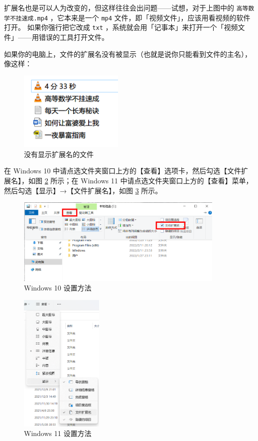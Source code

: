 扩展名也是可以人为改变的，但这样往往会出问题——试想，对于上图中的 \texttt{高等数学不挂速成.mp4} ，它本来是一个 \verb|mp4| 文件，即「视频文件」，应该用看视频的软件打开。
如果你强行把它改成 \verb|txt| ，系统就会用「记事本」来打开一个「视频文件」——用错误的工具打开文件。

如果你的电脑上，文件的扩展名没有被显示（也就是说你只能看到文件的主名），像这样：

\begin{figure}[htb!]
  \centering
  \includegraphics[width=5cm]{assets/Files_No_Ext.png}
  \caption{没有显示扩展名的文件}
  \label{File_No_Ext}
\end{figure}

在 Windows 10 中请点选文件夹窗口上方的【查看】选项卡，然后勾选【文件扩展名】，如图 \ref{Windows_10_set_full_filename} 所示；在 Windows 11 中请点选文件夹窗口上方的【查看】菜单，然后勾选【显示】→【文件扩展名】，如图 \ref{Windows_11_set_full_filename} 所示。

\begin{figure}[htb!]
  \centering
  \includegraphics[width=10cm]{assets/Windows_10_set_full_filename.png}
  \caption{Windows 10 设置方法}
  \label{Windows_10_set_full_filename}
\end{figure}

\begin{figure}[htb!]
  \centering
  \includegraphics[width=4cm]{assets/Windows_11_set_full_filename.png}
  \caption{Windows 11 设置方法}
  \label{Windows_11_set_full_filename}
\end{figure}

